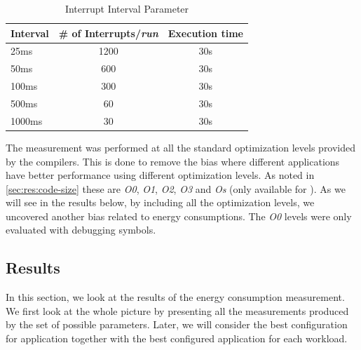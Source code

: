 \begin{table}[H]
  \centering
  \begin{tabular}{l | c | c}
    \textbf{Interval} & \textbf{\# of Interrupts/\emph{run}} & \textbf{Execution time} \\
    \hline
    25ms & 1200 & 30s \\
    50ms & 600 & 30s \\
    100ms & 300 & 30s \\
    500ms & 60 & 30s \\
    1000ms & 30 & 30s \\
    \hline
  \end{tabular}
  \caption{Interrupt Interval Parameter}
  \label{tab:res:energy:parameters}
\end{table}

The measurement was performed at all the standard optimization levels provided by the compilers.
This is done to remove the bias where different applications have better performance using different optimization levels.
As noted in \autoref{sec:res:code-size} these are \emph{O0}, \emph{O1}, \emph{O2}, \emph{O3} and \emph{Os} (only available for {\C}).
As we will see in the results below, by including all the optimization levels, we uncovered another bias related to energy consumptions.
The \emph{O0} levels were only evaluated with debugging symbols.

\subsection{Results}

In this section, we look at the results of the energy consumption measurement.
We first look at the whole picture by presenting all the measurements produced by the set of possible parameters.
Later, we will consider the best configuration for {\C} application together with the best configured {\rust} application for each workload.


